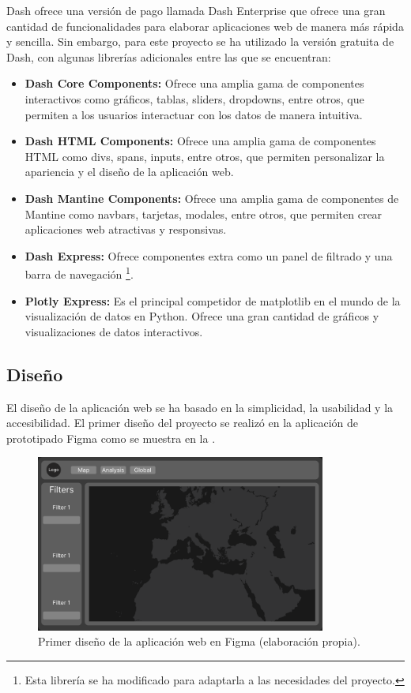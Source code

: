 Dash ofrece una versión de pago llamada Dash Enterprise que ofrece una gran cantidad de funcionalidades para elaborar aplicaciones web de manera más rápida y sencilla. Sin embargo, para este proyecto se ha utilizado la versión gratuita de Dash, con algunas librerías adicionales entre las que se encuentran:

\begin{itemize}
	\item \textbf{Dash Core Components:} Ofrece una amplia gama de componentes interactivos como gráficos, tablas, sliders, dropdowns, entre otros, que permiten a los usuarios interactuar con los datos de manera intuitiva.
	\item \textbf{Dash HTML Components:} Ofrece una amplia gama de componentes HTML como divs, spans, inputs, entre otros, que permiten personalizar la apariencia y el diseño de la aplicación web.
	\item \textbf{Dash Mantine Components:} Ofrece una amplia gama de componentes de Mantine como navbars, tarjetas, modales, entre otros, que permiten crear aplicaciones web atractivas y responsivas.
	\item \textbf{Dash Express:} Ofrece componentes extra como un panel de filtrado y una barra de navegación \footnote{Esta librería se ha modificado para adaptarla a las necesidades del proyecto.}.
	\item \textbf{Plotly Express:} Es el principal competidor de matplotlib en el mundo de la visualización de datos en Python. Ofrece una gran cantidad de gráficos y visualizaciones de datos interactivos.
\end{itemize}

\subsection*{Diseño}
El diseño de la aplicación web se ha basado en la simplicidad, la usabilidad y la accesibilidad. El primer diseño del proyecto se realizó en la aplicación de prototipado Figma como se muestra en la .

\begin{figure}[h]
	\centering
	\includegraphics[width=0.85\textwidth]{Imagenes/Chapter_4/first_draft.png}
	\caption[Primer diseño de la aplicación web en Figma.]{Primer diseño de la aplicación web en Figma (elaboración propia).}
	\label{fig:figma}
\end{figure}

